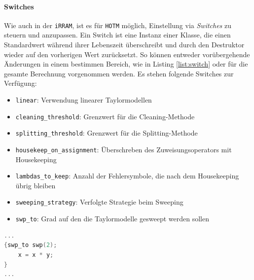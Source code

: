  \paragraph{Switches}
 Wie auch in der \verb+iRRAM+, ist es für \verb+HOTM+ möglich, Einstellung via \textit{Switches} zu steuern und anzupassen. Ein Switch ist eine Instanz einer Klasse, die einen Standardwert während ihrer Lebenszeit überschreibt und durch den Destruktor wieder auf den vorherigen Wert zurücksetzt. So können entweder vorübergehende Änderungen in einem bestimmen Bereich, wie in Listing \ref{list:switch} oder für die gesamte Berechnung vorgenommen werden. Es stehen folgende Switches zur Verfügung:
 \begin{itemize}
  \item \verb+linear+: Verwendung linearer Taylormodellen
  \item \verb+cleaning_threshold+: Grenzwert für die Cleaning-Methode
  \item \verb+splitting_threshold+: Grenzwert für die Splitting-Methode
  \item \verb+housekeep_on_assignment+: Überschreben des Zuweisungsoperators mit Housekeeping
  \item \verb+lambdas_to_keep+: Anzahl der Fehlersymbole, die nach dem Housekeeping übrig bleiben
  \item \verb+sweeping_strategy+: Verfolgte Strategie beim Sweeping
  \item \verb+swp_to+: Grad auf den die Taylormodelle gesweept werden sollen
 \end{itemize}

 
 
\begin{lstlisting}[language=C++,  style=cpp, caption={[Beispiel für Anwendung von Switches] Anwendung des \anf{swp\_to} Switches, um nur für diese Rechnung beim Sweeping den Zielgrad 2 zu setzen.}, label=list:switch]  
...
{swp_to swp(2);
    x = x * y;
}
...
\end{lstlisting}
 
 
 

